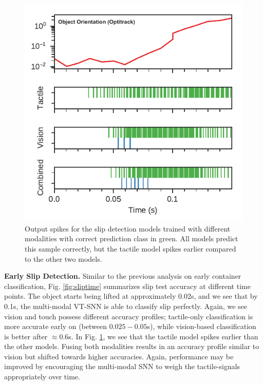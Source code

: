 \documentclass[fyp]{socreport}
\begin{document}
\begin{figure}
\centering
\includegraphics[width=0.85\columnwidth]{images/analysis/slip_class_output.pdf}
\caption{Output spikes for the slip detection models trained with different modalities with correct prediction class in green. All models predict this sample correctly, but the tactile model spikes earlier compared to the other two models.}
\label{fig:spikeslip}
\end{figure}

\vspace{0.3em}
\noindent\textbf{Early Slip Detection.} Similar to the previous analysis on
early container classification, Fig. \ref{fig:sliptime} summarizes slip test
accuracy at different time points. The object starts being lifted at
approximately 0.02s, and we see that by 0.1s, the multi-modal VT-SNN is able to
classify slip perfectly. Again, we see vision and touch possess different
accuracy profiles; tactile-only classification is more accurate early on
(between $0.025-0.05$s), while vision-based classification is better after
$\approx 0.6$s. In Fig. \ref{fig:spikeslip}, we see that the tactile model
spikes earlier than the other models. Fusing both modalities results in an
accuracy profile similar to vision but shifted towards higher accuracies. Again,
performance may be improved by encouraging the multi-modal SNN to weigh the
tactile-signals appropriately over time.

\end{document}
